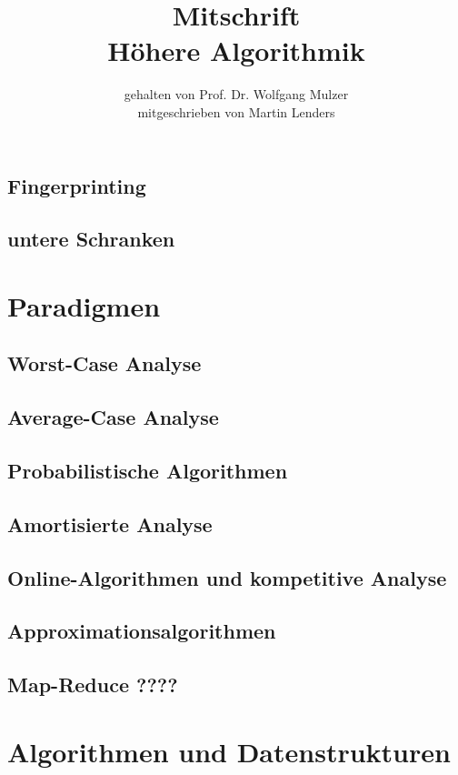 \documentclass[a4paper,10pt]{scrbook}
\title{Mitschrift\\{\LARGE Höhere Algorithmik}}
\author{gehalten von Prof. Dr. Wolfgang Mulzer \\ mitgeschrieben von Martin Lenders}
\begin{document}
\maketitle
\tableofcontents























\section{Fingerprinting}
\section{untere Schranken}
\chapter{Paradigmen}
\section{Worst-Case Analyse}
\section{Average-Case Analyse}
\section{Probabilistische Algorithmen}
\section{Amortisierte Analyse}
\section{Online-Algorithmen und kompetitive Analyse}
\section{Approximationsalgorithmen}
\section{Map-Reduce ????}
\chapter{Algorithmen und Datenstrukturen}
\end{document}
